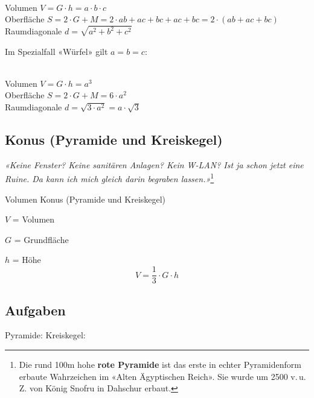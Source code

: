 \begin{gesetz}{}{}\\
  Volumen $V = G\cdot{} h = a\cdot{}b\cdot{}c$\\
  Oberfläche $S=2\cdot{}G + M = 2\cdot{}ab + ac + bc + ac + bc = 2\cdot{}(ab + ac + bc)$\\
  Raumdiagonale $d = \sqrt{a^2 + b^2 + c^2}$
\end{gesetz}

Im Spezialfall «Würfel» gilt $a=b=c$:
\begin{gesetz}{}{}\\
  Volumen $V = G\cdot{} h = a^3$\\
  Oberfläche $S=2\cdot{}G + M = 6\cdot{}a^2$\\
  Raumdiagonale $d = \sqrt{3\cdot{}a^2} = a\cdot{}\sqrt{3}$
\end{gesetz}


\newpage

\subsection{Konus (Pyramide und Kreiskegel)}



\begin{center}
{\textit{«Keine Fenster? Keine sanitären Anlagen? Kein W-LAN? Ist ja schon
jetzt eine Ruine. Da kann ich mich gleich darin begraben
lassen.»}}\footnote{Die rund 100m hohe \textbf{rote Pyramide} ist das
  erste in echter Pyramidenform erbaute Wahrzeichen im «Alten
  Ägyptischen Reich». Sie wurde um 2500 v.\,u.\,Z. von König Snofru in
Dahschur erbaut.}
\end{center}


\begin{gesetz}{Volumen Konus (Pyramide und Kreiskegel)}{}
  
  $V$ = Volumen
  
  $G$ = Grundfläche

  $h$ = Höhe
  $$V = \frac13\cdot{}G\cdot{}h$$
  \end{gesetz}

\subsection*{Aufgaben}
Pyramide:
Kreiskegel:
\newpage

